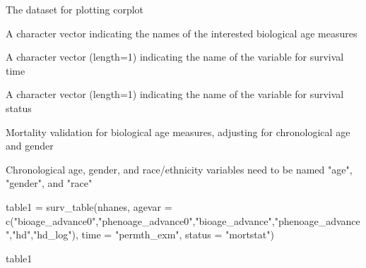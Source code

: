 \documentclass[a4paper]{book}
\begin{document}
\begin{Arguments}
\begin{ldescription}
\item[\code{data}] The dataset for plotting corplot

\item[\code{agevar}] A character vector indicating the names of the interested biological age measures

\item[\code{time}] A character vector (length=1) indicating the name of the variable for survival time

\item[\code{status}] A character vector (length=1) indicating the name of the variable for survival status
\end{ldescription}
\end{Arguments}
%
\begin{Details}\relax
Mortality validation for biological age measures, adjusting for chronological age and gender
\end{Details}
%
\begin{Note}\relax
Chronological age, gender, and race/ethnicity variables need to be named "age", "gender", and "race"
\end{Note}
%
\begin{Examples}
\begin{ExampleCode}
table1 = surv_table(nhanes,
                    agevar = c("bioage_advance0","phenoage_advance0","bioage_advance","phenoage_advance","hd","hd_log"),
                    time = "permth_exm",
                    status = "mortstat")

table1

\end{ExampleCode}
\end{Examples}
\printindex{}
\end{document}
